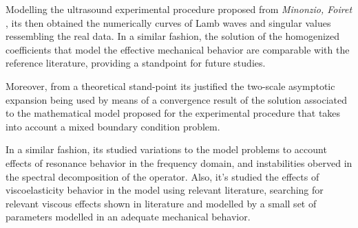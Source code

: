 \begin{intro}
Modelling the ultrasound experimental procedure proposed from \textit{Minonzio, Foiret} \cite{Foiret2014}, its then obtained the numerically curves of Lamb waves and singular values ressembling the real data. In a similar fashion, the solution of the homogenized coefficients that model the effective mechanical behavior are comparable with the reference literature, providing a standpoint for future studies.

Moreover, from a theoretical stand-point its justified the two-scale asymptotic expansion being used by means of a convergence result of the solution associated to the mathematical model proposed for the experimental procedure that takes into account a mixed boundary condition problem.

In a similar fashion, its studied variations to the model problems to account effects of resonance behavior in the frequency domain, and instabilities oberved in the spectral decomposition of the operator. 
Also, it's studied the effects of viscoelasticity behavior in the model using relevant literature, searching for relevant viscous effects shown in literature and modelled by a small set of parameters modelled in an adequate mechanical behavior.


\end{intro}